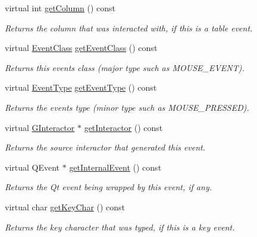 \begin{DoxyCompactItemize}
virtual int \mbox{\hyperlink{classsgl_1_1GEvent_a36cb86612277798a9adb168403386280}{get\+Column}} () const
\begin{DoxyCompactList}\small\item\em Returns the column that was interacted with, if this is a table event. \end{DoxyCompactList}\item 
virtual \mbox{\hyperlink{namespacesgl_a6ff6e8ee75a08092e30167b2b7c5d6f7}{Event\+Class}} \mbox{\hyperlink{classsgl_1_1GEvent_a84e9319971c682404ea8f030cfee38f9}{get\+Event\+Class}} () const
\begin{DoxyCompactList}\small\item\em Returns this event\textquotesingle{}s class (major type such as M\+O\+U\+S\+E\+\_\+\+E\+V\+E\+NT). \end{DoxyCompactList}\item 
virtual \mbox{\hyperlink{namespacesgl_a2628ea8d12e8b2563c32f05dc7fff6fa}{Event\+Type}} \mbox{\hyperlink{classsgl_1_1GEvent_a404fe4b126a8443600109a62ef7ce6a2}{get\+Event\+Type}} () const
\begin{DoxyCompactList}\small\item\em Returns the event\textquotesingle{}s type (minor type such as M\+O\+U\+S\+E\+\_\+\+P\+R\+E\+S\+S\+ED). \end{DoxyCompactList}\item 
virtual \mbox{\hyperlink{classsgl_1_1GInteractor}{G\+Interactor}} $\ast$ \mbox{\hyperlink{classsgl_1_1GEvent_ac8998a7ac699a98fbdc125ef0f3d64f1}{get\+Interactor}} () const
\begin{DoxyCompactList}\small\item\em Returns the source interactor that generated this event. \end{DoxyCompactList}\item 
virtual Q\+Event $\ast$ \mbox{\hyperlink{classsgl_1_1GEvent_ab3589ee7d7005f6a323ff2c968f82038}{get\+Internal\+Event}} () const
\begin{DoxyCompactList}\small\item\em Returns the Qt event being wrapped by this event, if any. \end{DoxyCompactList}\item 
virtual char \mbox{\hyperlink{classsgl_1_1GEvent_ab23396e09d92df320d2324b47a0766e8}{get\+Key\+Char}} () const
\begin{DoxyCompactList}\small\item\em Returns the key character that was typed, if this is a key event. \end{DoxyCompactList}\item 

\end{DoxyCompactItemize}
